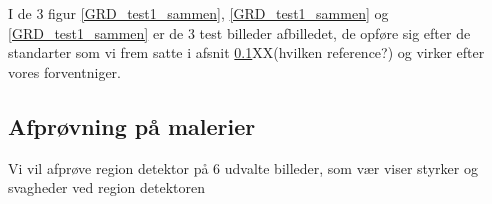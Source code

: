 \begin{figure}[!h]
    \centering
		\hspace{1em}
    	\hspace{1em}
        \caption[]{}
     \label{GRD_test3_sammen}
\end{figure}

I de 3 figur \ref{GRD_test1_sammen}, \ref{GRD_test1_sammen} og
\ref{GRD_test1_sammen} er de 3 test billeder afbilledet, de opføre sig
efter de standarter som vi frem satte i afsnit \ref{}XX(hvilken
reference?) og virker efter vores forventniger.

\subsection{Afprøvning på malerier}
Vi vil afprøve region detektor på 6 udvalte billeder, som vær viser
styrker og svagheder ved region detektoren

